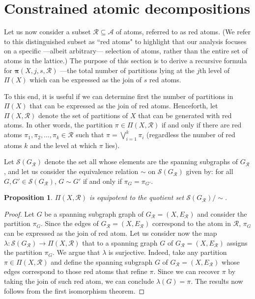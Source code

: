 \documentclass[12pt]{extarticle}
\newtheorem{Proposition}{Proposition}
\begin{document}
	\section{Constrained atomic decompositions}
	
	Let us now consider a subset $\mathcal{R}\subseteq\mathcal{A}$ of atoms, referred to as red atoms. (We refer to this distinguished subset as ``red atoms" to highlight that our analysis focuses on a specific ---albeit arbitrary--- selection of atoms, rather than the entire set of atoms in the lattice.) The purpose of this section is to derive a recursive formula for $\bm{\pi}(X,j,s,\mathcal{R})$ ---the total number of partitions lying at the $j$th level of $\Pi(X)$ which can be expressed as the join of $s$ red atoms.
	
	 To this end, it is useful if we can determine first the number of partitions in $\Pi(X)$ that can be expressed as the join of red atoms. Henceforth, let $\Pi(X,\mathcal{R})$ denote the set of partitions of $X$ that can be generated with red atoms. In other words, the partition $\pi\in\Pi(X,\mathcal{R})$ if and only if there are red atoms $\pi_1,\pi_2,\ldots,\pi_k\in \mathcal{R}$ such that $\pi=\bigvee_{i=1}^k \pi_i$ (regardless the number of red atoms $k$ and the level at which $\pi$ lies).
	
	Let $\mathcal{S}(G_{\mathcal{R}})$ denote the set all whose elements are the spanning subgraphs of $G_{\mathcal{R}}$, and let us consider the equivalence relation $\sim$ on $\mathcal{S}(G_{\mathcal{R}})$ given by: for all $G,G'\in\mathcal{S}(G_{\mathcal{R}})$, $G\sim G'$ if and only if $\pi_{G}=\pi_{G'}$.	
	
	\begin{Proposition}\label{graphsequivalenceclassesgivepartitions}
		$\Pi(X,\mathcal{R})$ is equipotent to the quotient set $\mathcal{S}(G_{\mathcal{R}})/\sim$.
	\end{Proposition}
	\begin{proof}
		Let $G$ be a spanning subgraph graph of $G_{\mathcal{R}}=(X, E_{\mathcal{R}})$ and consider the partition $\pi_{G}$. Since the edges of $G_{\mathcal{R}}=(X, E_{\mathcal{R}})$ correspond to the atom in $\mathcal{R}$, $\pi_{G}$ can be expressed as the join of red atom. Let us consider now the map $\lambda: \mathcal{S}(G_{\mathcal{R}})\rightarrow \Pi(X,\mathcal{R})$ that to a spanning graph $G$ of $G_{\mathcal{R}}=(X, E_{\mathcal{R}})$ assigns the partition $\pi_{G}$.  We argue that $\lambda$ is surjective. Indeed, take any partition $\pi\in\Pi(X,\mathcal{R})$ and define the spanning subgraph $G$ of $G_{\mathcal{R}}=(X, E_{\mathcal{R}})$ whose edges correspond to those red atoms that refine $\pi$. Since we can recover $\pi$ by taking the join of such red atom, we can conclude $\lambda(G)=\pi$. The results now follows from the first isomorphism theorem.
	\end{proof}
	
\end{document}

